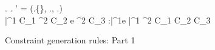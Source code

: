 \begin{figure*}[t!]

  {
    \rgn \in \A.\rhoenv \spc
    \rhobar \notin \A.\rhoenv
    \spc
    \A' = (\A.\rhoenv \cup \{\rhobar\}, \A.\aenv, 
          \A.\phicx \conj \phi)\spc
    \\
     {\bar{\tau^1}} {C_1} \spc
     {\tau^2} {C_2} \spc
     {e} {\tau^2} {C_3}
  }
  {
    \exprok {\stdcontext}
           {\lambdaexp{\rgn}{\rhobar \,|\, \phi} {\xbar:\bar{\tau^1}}{e}}
           {\inang{\rhobar \,|\, \phi} \bar{\tau^1} \xrightarrow{\rgn} \tau^2}
	   {C_1 \cup C_2 \cup C_3}
  }

\myendrules

\caption{Constraint generation rules: Part 1}
\label{fig:constraint-gen-0}
\end{figure*}

